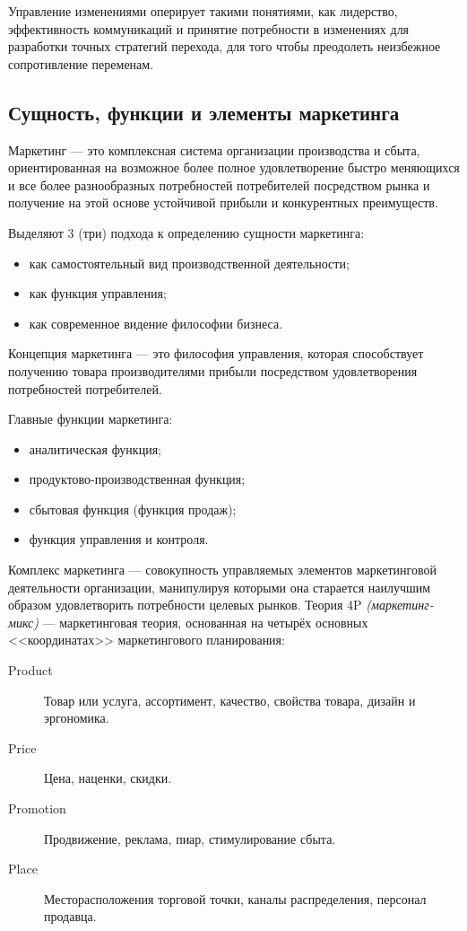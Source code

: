 \documentclass[a4paper,12pt,oneside,final]{extarticle}
\numberwithin{equation}{section}
\begin{document}
Управление изменениями оперирует такими понятиями, как лидерство, эффективность коммуникаций и принятие потребности в изменениях для разработки точных стратегий перехода, для того чтобы преодолеть неизбежное сопротивление переменам.

\subsection{Сущность, функции и элементы маркетинга}
Маркетинг --- это комплексная система организации производства и сбыта, ориентированная на возможное более полное удовлетворение быстро меняющихся и все более разнообразных потребностей потребителей посредством рынка и получение на этой основе устойчивой прибыли и конкурентных преимуществ.

Выделяют 3 (три) подхода к определению сущности маркетинга:
\begin{itemize}
	\item как самостоятельный вид производственной деятельности;
	\item как функция управления;
	\item как современное видение философии бизнеса.
\end{itemize}

Концепция маркетинга --- это философия управления, которая способствует получению товара производителями прибыли посредством удовлетворения потребностей потребителей.

Главные функции маркетинга:
\begin{itemize}
	\item аналитическая функция;
	\item продуктово-производственная функция;
	\item сбытовая функция (функция продаж);
	\item функция управления и контроля.
\end{itemize}

Комплекс маркетинга --- совокупность управляемых элементов маркетинговой деятельности организации, манипулируя которыми она старается наилучшим образом удовлетворить потребности целевых рынков.
Теория 4P \textit{(маркетинг-микс)} — маркетинговая теория, основанная на четырёх основных <<координатах>> маркетингового планирования:
\begin{description}
	\item[Product] Товар или услуга, ассортимент, качество, свойства товара, дизайн и эргономика.
	\item[Price] Цена, наценки, скидки.
	\item[Promotion] Продвижение, реклама, пиар, стимулирование сбыта.
	\item[Place] Месторасположения торговой точки, каналы распределения, персонал продавца.
\end{description}
\end{document}
